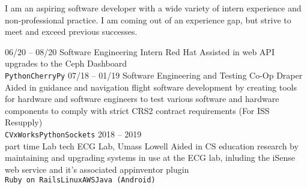 \documentclass[9pt]{developercv} %
\begin{document}
\vspace{0.5cm}



\begin{minipage}[t]{0.4\textwidth} %
	\vspace{-\baselineskip} %

    I am an aspiring software developer with a wide variety of intern experience
    and non-professional practice. I am coming out of an experience gap, but strive
    to meet and exceed previous successes.
\end{minipage}
\hfill %
\begin{minipage}[t]{0.5\textwidth} %
	\vspace{-\baselineskip} %
	\begin{barchart}{5.5}
	\end{barchart}
\end{minipage}



\begin{entrylist}
	\entry
		{06/20 -- 08/20}
		{Software Engineering Intern}
		{Red Hat}
		{Assisted in web API upgrades to the Ceph Dashboard\\
        \texttt{Python}\slashsep\texttt{CherryPy}}
	\entry
		{07/18 -- 01/19}
		{Software Engineering and Testing Co-Op}
		{Draper}
		{Aided in guidance and navigation flight software development by creating
        tools for hardware and software engineers to test various software and
        hardware components to comply with strict CRS2 contract requirements (For ISS Resupply)\\
        \texttt{C}\slashsep\texttt{VxWorks}\slashsep\texttt{Python}\slashsep\texttt{Sockets}}
	\entry
		{2018 -- 2019\\\footnotesize{part time}}
		{Lab tech}
        {ECG Lab, Umass Lowell}
		{Aided in CS education research by maintaining and upgrading systems in use at the ECG lab,
        inluding the iSense web service and it's associated appinventor plugin\\
        \texttt{Ruby on Rails}\slashsep\texttt{Linux}\slashsep\texttt{AWS}\slashsep\texttt{Java (Android)}}
\end{entrylist}
\end{document}
